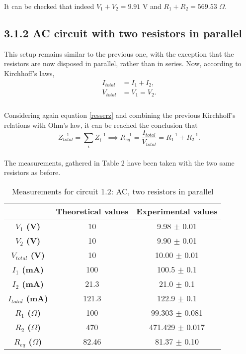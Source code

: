 \documentclass[a4paper, 12pt]{article}
\begin{document}
It can be checked that indeed $V_1 + V_2 = 9.91 $ V and $R_1 + R_2 = 569.53 $ $\Omega$.
\subsection{3.1.2 AC circuit with two resistors in parallel}
This setup remains similar to the previous one, with the exception that the resistors are now disposed in parallel, rather than in series. Now, according to Kirchhoff's laws,
\begin{align*}\label{respar}
	I_{total} &= I_1 + I_2, \\
	V_{total} &= V_1 = V_2. \\
\end{align*}\\

Considering again equation \ref{resserz} and combining the previous Kirchhoff's relations with Ohm's law, it can be reached the conclusion that
\begin{equation}\label{ztotrespar}
	Z_{total}^{-1} = \sum_{i} Z_i^{-1} \implies R_{eq}^{-1} = \frac{I_{total}}{V_{total}} = R_1^{-1} + R_2^{-1}.
\end{equation}\\

The measurements, gathered in Table 2 have been taken with the two same resistors as before.
\begin{table}[hbt!]
	\centering
	\begin{tabular}{|c|c|c|}
		\hline
		& \textbf{Theoretical values} & \textbf{Experimental values} \\
		\hline
		\textbf{$V_{1}$ (V)} & 10 & 9.98 $\pm$ 0.01 \\
		\textbf{$V_{2}$ (V)} & 10 & 9.90 $\pm$ 0.01 \\
		\textbf{$V_{total}$ (V)} & 10 & 10.00 $\pm$ 0.01\\
		\hline
		\textbf{$I_{1}$ (mA)} & 100  & 100.5 $\pm$ 0.1 \\
		\textbf{$I_{2}$ (mA)} & 21.3 & 21.0 $\pm$ 0.1 \\
		\textbf{$I_{total}$ (mA)} & 121.3 & 122.9 $\pm$ 0.1 \\
		\hline
		\textbf{$R_{1}$ ($\Omega$)} & 100 & 99.303 $\pm$ 0.081 \\
		\textbf{$R_{2}$ ($\Omega$)} & 470 & 471.429 $\pm$ 0.017 \\
		\textbf{$R_{eq}$ ($\Omega$)} & 82.46 & 81.37 $\pm$ 0.10 \\
		
		\hline
	\end{tabular}
	\caption{Measurements for circuit 1.2: AC, two resistors in parallel}
\end{table}\\
\end{document}
